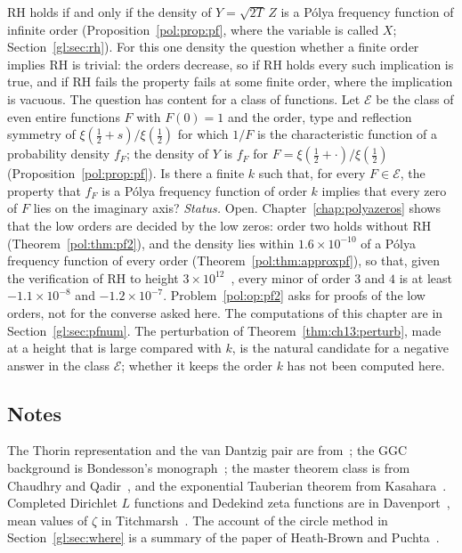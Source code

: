 \begin{problem}\label{gl:op:pf}
RH holds if and only if the density of $Y=\sqrt{2T}\,Z$ is a P\'olya frequency function of infinite order (Proposition~\ref{pol:prop:pf}, where the variable is called $X$; Section~\ref{gl:sec:rh}). For this one density the question whether a finite order implies RH is trivial: the orders decrease, so if RH holds every such implication is true, and if RH fails the property fails at some finite order, where the implication is vacuous. The question has content for a class of functions. Let $\mathcal E$ be the class of even entire functions $F$ with $F(0)=1$ and the order, type and reflection symmetry of $\xi(\tfrac12+s)/\xi(\tfrac12)$ for which $1/F$ is the characteristic function of a probability density $f_F$; the density of $Y$ is $f_F$ for $F=\xi(\tfrac12+\cdot)/\xi(\tfrac12)$ (Proposition~\ref{pol:prop:pf}). Is there a finite $k$ such that, for every $F\in\mathcal E$, the property that $f_F$ is a P\'olya frequency function of order $k$ implies that every zero of $F$ lies on the imaginary axis? \emph{Status.} Open. Chapter~\ref{chap:polyazeros} shows that the low orders are decided by the low zeros: order two holds without RH (Theorem~\ref{pol:thm:pf2}), and the density lies within $1.6\times10^{-10}$ of a P\'olya frequency function of every order (Theorem~\ref{pol:thm:approxpf}), so that, given the verification of RH to height $3\times10^{12}$~\cite{PT21}, every minor of order $3$ and $4$ is at least $-1.1\times10^{-8}$ and $-1.2\times10^{-7}$. Problem~\ref{pol:op:pf2} asks for proofs of the low orders, not for the converse asked here. The computations of this chapter are in Section~\ref{gl:sec:pfnum}. The perturbation of Theorem~\ref{thm:ch13:perturb}, made at a height that is large compared with $k$, is the natural candidate for a negative answer in the class $\mathcal E$; whether it keeps the order $k$ has not been computed here.
\end{problem}

\subsection*{Notes}

The Thorin representation and the van Dantzig pair are from~\cite{P17,P18}; the GGC background is Bondesson's monograph~\cite{Bondesson}; the master theorem class is from Chaudhry and Qadir~\cite{ChaudhryQadir12}, and the exponential Tauberian theorem from Kasahara~\cite{Kasahara78}. Completed Dirichlet $L$ functions and Dedekind zeta functions are in Davenport~\cite{Davenport}, mean values of $\zeta$ in Titchmarsh~\cite{Titchmarsh}. The account of the circle method in Section~\ref{gl:sec:where} is a summary of the paper of Heath-Brown and Puchta~\cite{HBP02}.
